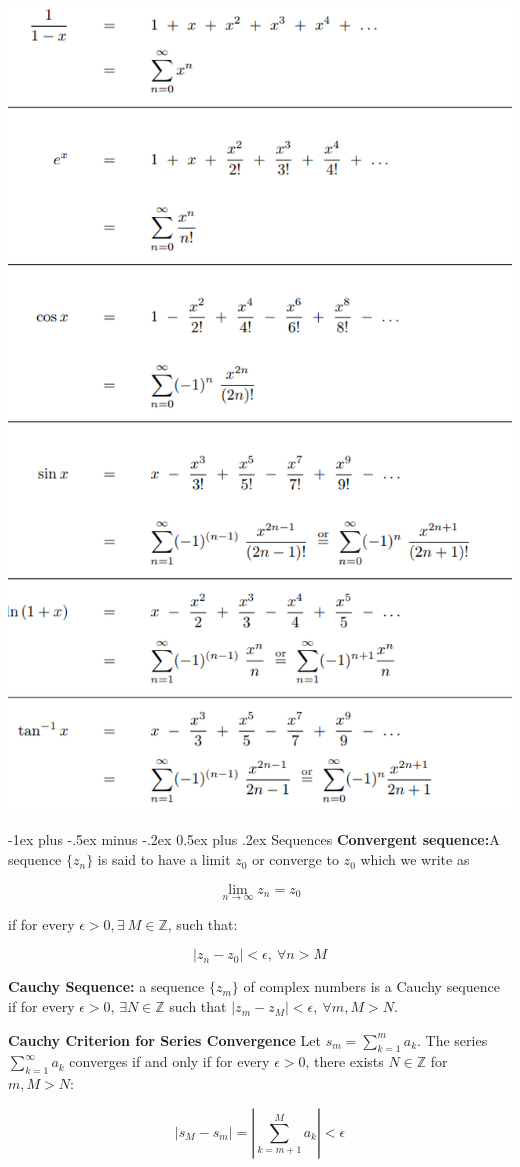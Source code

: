 \documentclass{article}
\makeatletter
\theoremstyle{definition}
\renewcommand{\section}{\@startsection{section}{1}{0mm}%
	{-1ex plus -.5ex minus -.2ex}%
	{0.5ex plus .2ex}%
	{\normalfont\large\bfseries}}
\makeatother
\begin{document}
\begin{multicols}{3}
\includegraphics[width=0.7\linewidth]{common_taylor_series}



\section{Sequences}
\textbf{Convergent sequence:}A sequence $\{z_n\}$ is said to have a limit $z_0$ or converge to $z_0$ which we write as 
	
	$$\lim_{n\to\infty} z_n = z_0$$
	
	if for every $\epsilon > 0, \exists\ M \in  \mathbb{Z}$, such that:
	
	$$|z_n - z_0| < \epsilon,\ \forall n > M$$

\textbf{Cauchy Sequence:} a sequence $\{z_m\}$ of complex numbers is a Cauchy sequence if for every $\epsilon>0$, $\exists N \in \mathbb{Z}$ such that $|z_m - z_M| < \epsilon,\ \forall m, M>N$.

\textbf{Cauchy Criterion for Series Convergence} Let $s_m = \sum_{k=1}^{m}a_k$. The series $\sum_{k=1}^{\infty}a_k$ converges if and only if for every $\epsilon>0$, there exists $N \in \mathbb{Z}$ for $m, M>N$:

$$|s_M - s_m| = \left|\sum_{k=m+1}^{M}a_k\right| < \epsilon$$


\end{multicols}
\end{document}

